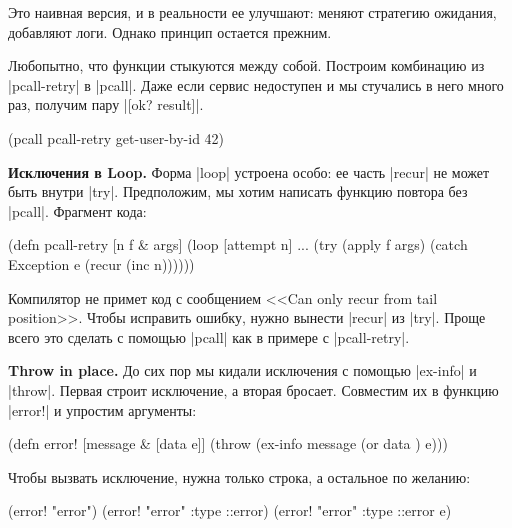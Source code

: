 Это наивная версия, и в реальности ее улучшают: меняют стратегию ожидания,
добавляют логи. Однако принцип остается прежним.

Любопытно, что функции стыкуются между собой. Построим комбинацию из
\spverb|pcall-retry| в \spverb|pcall|. Даже если сервис недоступен и мы
стучались в него много раз, получим пару \spverb|[ok? result]|.

\begin{english}
  \begin{clojure}
(pcall pcall-retry get-user-by-id 42)
  \end{clojure}
\end{english}

\textbf{Исключения в Loop.} Форма \spverb|loop| устроена особо: ее часть
\spverb|recur| не может быть внутри \spverb|try|. Предположим, мы хотим написать
функцию повтора без \spverb|pcall|. Фрагмент кода:

\begin{english}
  \begin{clojure}
(defn pcall-retry [n f & args]
  (loop [attempt n]
    ...
    (try
      (apply f args)
      (catch Exception e
        (recur (inc n))))))
  \end{clojure}
\end{english}

Компилятор не примет код с сообщением <<Can only recur from tail
position>>. Чтобы исправить ошибку, нужно вынести \spverb|recur| из
\spverb|try|. Проще всего это сделать с помощью \spverb|pcall| как в примере с
\spverb|pcall-retry|.

\textbf{Throw in place.} До сих пор мы кидали исключения с помощью
\spverb|ex-info| и \spverb|throw|. Первая строит исключение, а вторая
бросает. Совместим их в функцию \spverb|error!| и упростим аргументы:

\begin{english}
  \begin{clojure}
(defn error! [message & [data e]]
  (throw (ex-info message (or data {}) e)))
  \end{clojure}
\end{english}

Чтобы вызвать исключение, нужна только строка, а остальное по желанию:

\begin{english}
  \begin{clojure}
(error! "error")
(error! "error" {:type ::error})
(error! "error" {:type ::error} e)
  \end{clojure}
\end{english}

